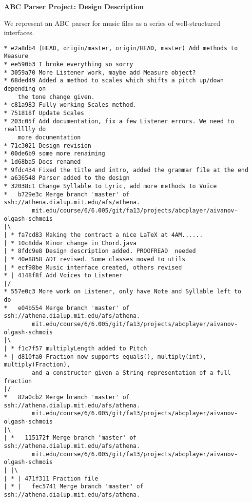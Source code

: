 \documentclass[12pt]{book}
\begin{document}
\phantom{xxx}
\bigskip
\centerline{{\large \bf ABC Parser Project: Design Description }}
\bigskip\bigskip

We represent an ABC parser for music files as a series of well-structured interfaces.

\begin{verbatim}
* e2a8db4 (HEAD, origin/master, origin/HEAD, master) Add methods to Measure
* ee590b3 I broke everything so sorry
* 3059a70 More Listener work, maybe add Measure object?
* 68ded49 Added a method to scales which shifts a pitch up/down depending on 
	the tone change given.
* c81a983 Fully working Scales method.
* 751818f Update Scales
* 203c05f Add documentation, fix a few Listener errors. We need to reallllly do 
	more documentation
* 71c3021 Design revision
* 00de6b9 some more renaiming
* 1d68ba5 Docs renamed
* 9fdc434 Fixed the title and intro, added the grammar file at the end
* a636548 Parser added to the design
* 32038c1 Change Syllable to Lyric, add more methods to Voice
*   b729e3c Merge branch 'master' of ssh://athena.dialup.mit.edu/afs/athena.
		mit.edu/course/6/6.005/git/fa13/projects/abcplayer/aivanov-olgash-schmois
|\
| * fa7cd83 Making the contract a nice LaTeX at 4AM......
| * 10c8dda Minor change in Chord.java
| * 8fdc9e8 Design description added. PROOFREAD  needed
| * 40e8858 ADT revised. Some classes moved to utils
| * ecf98be Music interface created, others revised
* | 4148f8f Add Voices to Listener
|/
* 557e0c3 More work on Listener, only have Note and Syllable left to do
*   e04b554 Merge branch 'master' of ssh://athena.dialup.mit.edu/afs/athena.
		mit.edu/course/6/6.005/git/fa13/projects/abcplayer/aivanov-olgash-schmois
|\
| * f1c7f57 multiplyLength added to Pitch
* | d810fa0 Fraction now supports equals(), multiply(int), multiply(Fraction), 
		and a constructor given a String representation of a full fraction
|/
*   82a0cb2 Merge branch 'master' of ssh://athena.dialup.mit.edu/afs/athena.
		mit.edu/course/6/6.005/git/fa13/projects/abcplayer/aivanov-olgash-schmois
|\
| *   115172f Merge branch 'master' of ssh://athena.dialup.mit.edu/afs/athena.
		mit.edu/course/6/6.005/git/fa13/projects/abcplayer/aivanov-olgash-schmois
| |\
| * | 471f311 Fraction file
| * |   fec5741 Merge branch 'master' of ssh://athena.dialup.mit.edu/afs/athena.

\end{verbatim}
\end{document}
